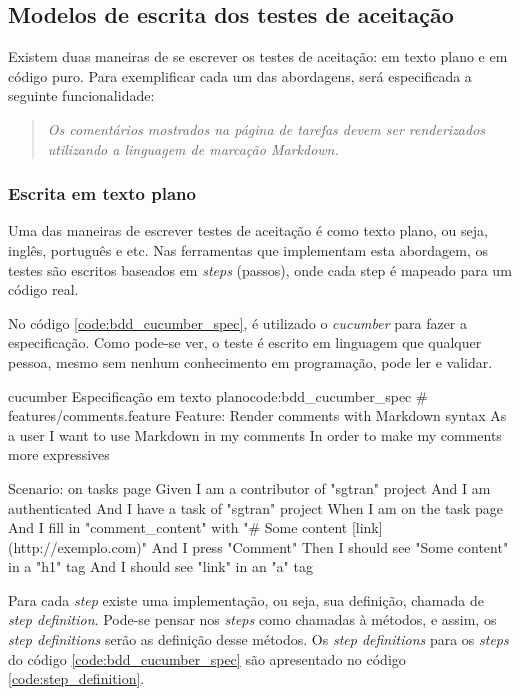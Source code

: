 
\subsection{Modelos de escrita dos testes de aceitação}
\label{sub:modelos_de_escrita_dos_testes_de_aceitacao}

Existem duas maneiras de se escrever os testes de aceitação: em texto plano e em código puro. Para exemplificar cada um das abordagens, será especificada a seguinte funcionalidade:

\begin{quote}
\textit{Os comentários mostrados na página de tarefas devem ser renderizados utilizando a linguagem de marcação Markdown.}
\end{quote}

\subsubsection{Escrita em texto plano} %
\label{subsub:escrita_em_texto_plano}

Uma das maneiras de escrever testes de aceitação é como texto plano, ou seja, inglês, português e etc. Nas ferramentas que implementam esta abordagem, os testes são escritos baseados em \textit{steps} (passos), onde cada step é mapeado para um código real.

No código \ref{code:bdd_cucumber_spec}, é utilizado o \textit{cucumber} para fazer a especificação. Como pode-se ver, o teste é escrito em linguagem que qualquer pessoa, mesmo sem nenhum conhecimento em programação, pode ler e validar.

\begin{mycode}{cucumber}%
{Especificação em texto plano}{code:bdd_cucumber_spec}
# features/comments.feature
Feature: Render comments with Markdown syntax
  As a user
  I want to use Markdown in my comments
  In order to make my comments more expressives

  Scenario: on tasks page
    Given I am a contributor of "sgtran" project
    And I am authenticated
    And I have a task of "sgtran" project
    When I am on the task page
    And I fill in "comment_content" with "# Some content [link](http://exemplo.com)"
    And I press "Comment"
    Then I should see "Some content" in a "h1" tag
    And I should see "link" in an "a" tag
\end{mycode}

Para cada \textit{step} existe uma implementação, ou seja, sua definição, chamada de \textit{step definition}. Pode-se pensar nos \textit{steps} como chamadas à métodos, e assim, os \textit{step definitions} serão as definição desse métodos. Os \textit{step definitions} para os \textit{steps} do código \ref{code:bdd_cucumber_spec} são apresentado no código \ref{code:step_definition}.

